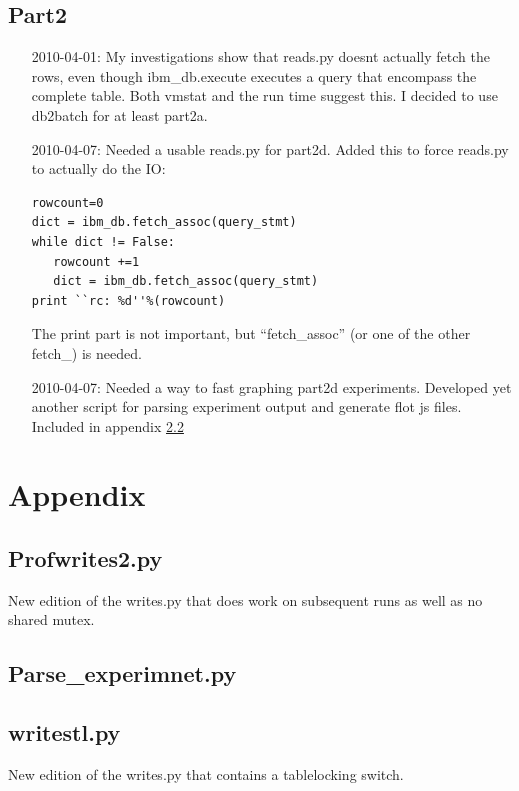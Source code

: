 \section{Part2}\label{logb:part2}
\begin{itemize}
  \item[2010-04-01:] My investigations show that reads.py  doesnt actually fetch
    the rows, even though ibm\_db.execute executes a query that encompass the
    complete table. Both vmstat and the run time suggest this. I decided to use
    db2batch for at least part2a.
  \item[2010-04-07:] Needed a usable reads.py for part2d. Added this to force
    reads.py to actually do the IO:
\begin{verbatim}
rowcount=0
dict = ibm_db.fetch_assoc(query_stmt)
while dict != False:
   rowcount +=1
   dict = ibm_db.fetch_assoc(query_stmt)
print ``rc: %d''%(rowcount) 
\end{verbatim}
The print part is not important, but ``fetch\_assoc'' (or one of the other
fetch\_) is needed.
   \item[2010-04-07:] Needed a way to fast graphing part2d experiments.
     Developed yet another script for parsing experiment output and generate
     flot js files. Included in appendix \ref{app:parseexperiment}
\end{itemize}

\appendix
\newpage
\chapter{Appendix}
\section{Profwrites2.py}\label{app:prof}
New edition of the writes.py that does work on subsequent runs as well as no
shared mutex.


\section{Parse\_experimnet.py}\label{app:parseexperiment}



\section{writestl.py}\label{app:tl}
New edition of the writes.py that contains a tablelocking switch.


